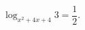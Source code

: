 \begin{ex}[type=equation]
	\begin{condition}
		$\log_{x^2 + 4x + 4} 3 = \dfrac{1}{2}.$
	\end{condition}
\end{ex}
